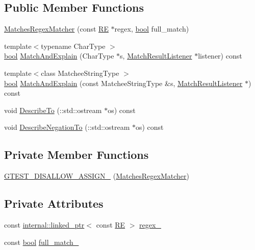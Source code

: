 \subsection*{Public Member Functions}
\begin{DoxyCompactItemize}
\item 
\hyperlink{classtesting_1_1internal_1_1MatchesRegexMatcher_acce0beb9c72166b1c5771869cfebedd1}{Matches\+Regex\+Matcher} (const \hyperlink{classtesting_1_1internal_1_1RE}{RE} $\ast$regex, \hyperlink{classbool}{bool} full\+\_\+match)
\item 
{\footnotesize template$<$typename Char\+Type $>$ }\\\hyperlink{classbool}{bool} \hyperlink{classtesting_1_1internal_1_1MatchesRegexMatcher_a00f5f9b19a5308d8daacc502c88a91ba}{Match\+And\+Explain} (Char\+Type $\ast$s, \hyperlink{classtesting_1_1MatchResultListener}{Match\+Result\+Listener} $\ast$listener) const
\item 
{\footnotesize template$<$class Matchee\+String\+Type $>$ }\\\hyperlink{classbool}{bool} \hyperlink{classtesting_1_1internal_1_1MatchesRegexMatcher_a57042ed4ce640738728d976f63f0702e}{Match\+And\+Explain} (const Matchee\+String\+Type \&s, \hyperlink{classtesting_1_1MatchResultListener}{Match\+Result\+Listener} $\ast$) const
\item 
void \hyperlink{classtesting_1_1internal_1_1MatchesRegexMatcher_a8ebd3a0cf33a7bad04a3daf4b0653d8f}{Describe\+To} (\+::std\+::ostream $\ast$os) const
\item 
void \hyperlink{classtesting_1_1internal_1_1MatchesRegexMatcher_a63154c9c572c1e44a130d58539fde707}{Describe\+Negation\+To} (\+::std\+::ostream $\ast$os) const
\end{DoxyCompactItemize}
\subsection*{Private Member Functions}
\begin{DoxyCompactItemize}
\item 
\hyperlink{classtesting_1_1internal_1_1MatchesRegexMatcher_a1dcc2e98d0e00bb3fed63d1e19f324b8}{G\+T\+E\+S\+T\+\_\+\+D\+I\+S\+A\+L\+L\+O\+W\+\_\+\+A\+S\+S\+I\+G\+N\+\_\+} (\hyperlink{classtesting_1_1internal_1_1MatchesRegexMatcher}{Matches\+Regex\+Matcher})
\end{DoxyCompactItemize}
\subsection*{Private Attributes}
\begin{DoxyCompactItemize}
\item 
const \hyperlink{classtesting_1_1internal_1_1linked__ptr}{internal\+::linked\+\_\+ptr}$<$ const \hyperlink{classtesting_1_1internal_1_1RE}{RE} $>$ \hyperlink{classtesting_1_1internal_1_1MatchesRegexMatcher_a585228fef5cc1158f064aa4f3eaf882e}{regex\+\_\+}
\item 
const \hyperlink{classbool}{bool} \hyperlink{classtesting_1_1internal_1_1MatchesRegexMatcher_ac2690d696a5a1ec134a90c5cc21b2072}{full\+\_\+match\+\_\+}
\end{DoxyCompactItemize}


